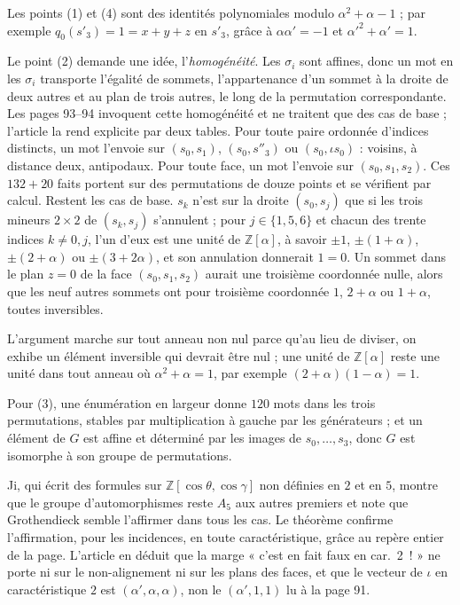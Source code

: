 \documentclass[11pt,a4paper]{amsart}
\theoremstyle{definition}
\theoremstyle{plain}
\theoremstyle{remark}
\newcommand{\Z}{\mathbb Z}
\begin{document}
Les points (1) et (4) sont des identités polynomiales modulo $\alpha^2 + \alpha - 1$ ; par exemple $q_0(s'_3) = 1 = x + y + z$ en $s'_3$, grâce à $\alpha\alpha' = -1$ et $\alpha'^2 + \alpha' = 1$.

Le point (2) demande une idée, l'\emph{homogénéité}. Les $\sigma_i$ sont affines, donc un mot en les $\sigma_i$ transporte l'égalité de sommets, l'appartenance d'un sommet à la droite de deux autres et au plan de trois autres, le long de la permutation correspondante. Les pages 93--94 invoquent cette homogénéité et ne traitent que des cas de base ; l'article la rend explicite par deux tables. Pour toute paire ordonnée d'indices distincts, un mot l'envoie sur $(s_0, s_1)$, $(s_0, s''_3)$ ou $(s_0, \iota s_0)$ : voisins, à distance deux, antipodaux. Pour toute face, un mot l'envoie sur $(s_0, s_1, s_2)$. Ces $132 + 20$ faits portent sur des permutations de douze points et se vérifient par calcul. Restent les cas de base. $s_k$ n'est sur la droite $(s_0, s_j)$ que si les trois mineurs $2 \times 2$ de $(s_k, s_j)$ s'annulent ; pour $j \in \{1, 5, 6\}$ et chacun des trente indices $k \ne 0, j$, l'un d'eux est une unité de $\Z[\alpha]$, à savoir $\pm1$, $\pm(1+\alpha)$, $\pm(2+\alpha)$ ou $\pm(3+2\alpha)$, et son annulation donnerait $1 = 0$. Un sommet dans le plan $z = 0$ de la face $(s_0, s_1, s_2)$ aurait une troisième coordonnée nulle, alors que les neuf autres sommets ont pour troisième coordonnée $1$, $2 + \alpha$ ou $1 + \alpha$, toutes inversibles.

L'argument marche sur tout anneau non nul parce qu'au lieu de diviser, on exhibe un élément inversible qui devrait être nul ; une unité de $\Z[\alpha]$ reste une unité dans tout anneau où $\alpha^2 + \alpha = 1$, par exemple $(2 + \alpha)(1 - \alpha) = 1$.

Pour (3), une énumération en largeur donne $120$ mots dans les trois permutations, stables par multiplication à gauche par les générateurs ; et un élément de $G$ est affine et déterminé par les images de $s_0, \dots, s_3$, donc $G$ est isomorphe à son groupe de permutations.

Ji, qui écrit des formules sur $\Z[\cos\theta, \cos\gamma]$ non définies en $2$ et en $5$, montre que le groupe d'automorphismes reste $A_5$ aux autres premiers et note que Grothendieck semble l'affirmer dans tous les cas. Le théorème confirme l'affirmation, pour les incidences, en toute caractéristique, grâce au repère entier de la page. L'article en déduit que la marge « c'est en fait faux en car.~2~! » ne porte ni sur le non-alignement ni sur les plans des faces, et que le vecteur de $\iota$ en caractéristique $2$ est $(\alpha', \alpha, \alpha)$, non le $(\alpha', 1, 1)$ lu à la page 91.
\end{document}
